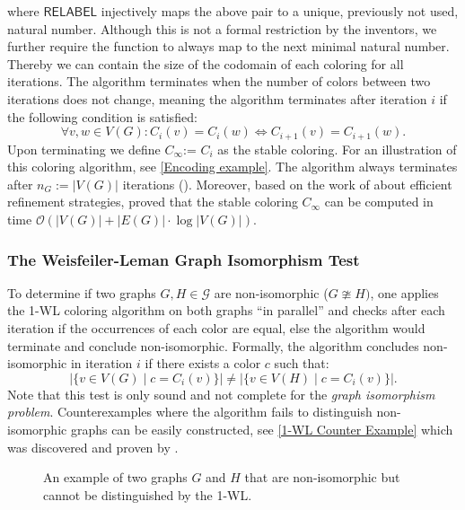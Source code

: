 \documentclass[11pt, dvipsnames, DIV=12]{scrreprt}
\theoremstyle{definition}
\begin{document}
\noindent where $\textsf{RELABEL}$ injectively maps the above pair to a unique, previously not used, natural number. Although this is not a formal restriction by the inventors, we further require the function to always map to the next minimal natural number. Thereby we can contain the size of the codomain of each coloring for all iterations. The algorithm terminates when the number of colors between two iterations does not change, meaning the algorithm terminates after iteration $i$ if the following condition is satisfied:
\begin{equation*}
\forall v,w \in V(G):  C_i(v) = C_i(w) \iff C_{i+1}(v) = C_{i+1}(w).
\end{equation*}
Upon terminating we define $C_{\infty}$:= $C_i$ as the stable coloring. For an illustration of this coloring algorithm, see \autoref{Encoding example}. The algorithm always terminates after $n_G:= |V(G)|$ iterations (\cite{Gro2017}). Moreover, based on the work of \cite{Pai+87} about efficient refinement strategies, \cite{Car+82} proved that the stable coloring $C_\infty$ can be computed in time $\mathcal{O}(| V(G) | + |E(G)| \cdot \log | V(G) |)$.

\subsubsection{The Weisfeiler-Leman Graph Isomorphism Test}
To determine if two graphs $G, H \in \mathcal{G}$ are non-isomorphic ($G \ncong H)$, one applies the 1-WL coloring algorithm on both graphs ``in parallel'' and checks after each iteration if the occurrences of each color are equal, else the algorithm would terminate and conclude non-isomorphic. Formally, the algorithm concludes non-isomorphic in iteration $i$ if there exists a color $c$ such that: 
\begin{equation*}
    |\{ v \in V(G) \mid c = C_i(v)\} | \neq |\{ v \in V(H) \mid c = C_i(v)\} |.
\end{equation*}
Note that this test is only sound and not complete for the \textit{graph isomorphism problem}. Counterexamples where the algorithm fails to distinguish non-isomorphic graphs can be easily constructed, see \autoref{1-WL Counter Example} which was discovered and proven by \cite{Cai1992}.

\begin{figure}[H]
    \centering
    
    \caption{An example of two graphs $G$ and $H$ that are non-isomorphic but cannot be distinguished by the 1-WL.}
    \label{1-WL Counter Example}
\end{figure}
\end{document}
